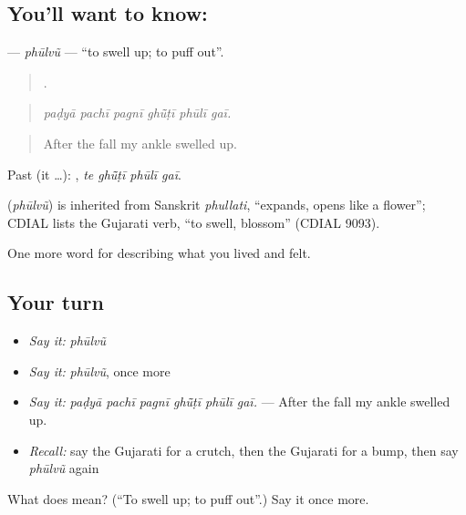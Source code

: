 \subsection*{You'll want to know: }
\textbf{} — \emph{phūlvũ} — \textquotedblleft{}to swell up; to puff out\textquotedblright{}.

\begin{quote}
     .
\end{quote}

\begin{quote}
\emph{paḍyā pachī pagnī ghū̃ṭī phūlī gaī.}
\end{quote}

\begin{quote}
After the fall my ankle swelled up.
\end{quote}

Past (it …):    , \emph{te ghū̃ṭī phūlī gaī}.

\begin{cousinweb}
\textbf{} (\emph{phūlvũ}) is inherited from Sanskrit \emph{phullati}, \textquotedblleft{}expands, opens like a flower\textquotedblright{}; CDIAL lists the Gujarati verb, \textquotedblleft{}to swell, blossom\textquotedblright{} (CDIAL 9093).
\end{cousinweb}

\begin{grammarlens}[title={What you've built}]
One more word for describing what you lived and felt.
\end{grammarlens}

\subsection*{Your turn}
\begin{itemize}
\raggedright
  \item \emph{Say it:} \emph{phūlvũ}
  \item \emph{Say it:} \emph{phūlvũ}, once more
  \item \emph{Say it:} \emph{paḍyā pachī pagnī ghū̃ṭī phūlī gaī.} — After the fall my ankle swelled up.
  \item \emph{Recall:} say the Gujarati for a crutch, then the Gujarati for a bump, then say \emph{phūlvũ} again
\end{itemize}

\begin{tcolorbox}[breakable,colback=teal!4,colframe=teal!35!black,title={Before you move on}]
What does  mean? (\textquotedblleft{}To swell up; to puff out\textquotedblright{}.) Say it once more.
\end{tcolorbox}
